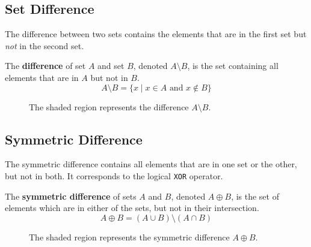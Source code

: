 \subsection*{Set Difference}
The difference between two sets contains the elements that are in the first set but \textit{not} in the second set.

\begin{definition}
    The \textbf{difference} of set $A$ and set $B$, denoted $A \setminus B$, is the set containing all elements that are in $A$ but not in $B$.
    \[ A \setminus B = \{ x \mid x \in A \text{ and } x \notin B \} \]
\end{definition}

\begin{figure}[htbp]
    \centering
    \caption{The shaded region represents the difference $A \setminus B$.}
    \label{fig:difference_custom}
\end{figure}

\subsection*{Symmetric Difference}
The symmetric difference contains all elements that are in one set or the other, but not in both. It corresponds to the logical \texttt{XOR} operator.

\begin{definition}
    The \textbf{symmetric difference} of sets $A$ and $B$, denoted $A \oplus B$, is the set of elements which are in either of the sets, but not in their intersection.
    \[ A \oplus B = (A \cup B) \setminus (A \cap B) \]
\end{definition}

\begin{figure}[htbp]
    \centering
    \caption{The shaded region represents the symmetric difference $A \oplus B$.}
    \label{fig:symmetric_difference_custom}
\end{figure}

